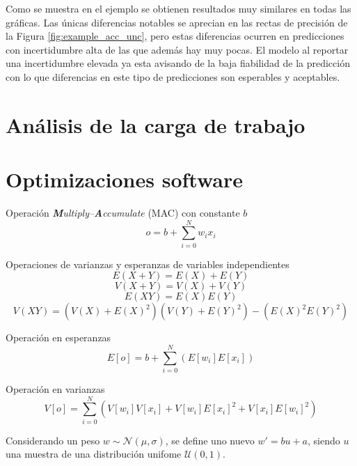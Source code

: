 Como se muestra en el ejemplo se obtienen resultados muy similares en todas las gráficas. Las únicas diferencias notables se aprecian en las rectas de precisión de la Figura \ref{fig:example_acc_unc}, pero estas diferencias ocurren en predicciones con incertidumbre alta de las que además hay muy pocas. El modelo al reportar una incertidumbre elevada ya esta avisando de la baja fiabilidad de la predicción con lo que diferencias en este tipo de predicciones son esperables y aceptables.

\section{Análisis de la carga de trabajo}

\section{Optimizaciones software}
\todo

Operación \textit{\textbf{M}ultiply–\textbf{A}ccumulate} (MAC) con constante $b$
\begin{equation} \label{eq:mac}
o = b + \sum_{i=0}^N w_i x_i
\end{equation}

Operaciones de varianzas y esperanzas de variables independientes \todo
\begin{equation} \label{eq:neuron_variance}
E(X+Y) = E(X)+ E(Y)
\end{equation}
\begin{equation} \label{eq:neuron_variance}
V(X+Y) = V(X) + V(Y)
\end{equation}
\begin{equation} \label{eq:neuron_variance}
E(XY) = E(X)E(Y)
\end{equation}
\begin{equation} \label{eq:neuron_variance}
V(XY) = (V(X)+E(X)^2)(V(Y)+E(Y)^2) - (E(X)^2E(Y)^2)
\end{equation}

Operación en esperanzas
\begin{equation} \label{eq:neuron_expected}
E[o] = b + \sum_{i=0}^N ( E[w_i] E[x_i] )
\end{equation}

Operación en varianzas
\begin{equation} \label{eq:neuron_variance}
V[o] = \sum_{i=0}^N ( V[w_i]V[x_i] + V[w_i]E[x_i]^2 + V[x_i]E[w_i]^2 )
\end{equation}

Considerando un peso $w \sim \mathcal{N}(\mu,\sigma)$, se define uno nuevo $w' = b u + a$, siendo $u$ una muestra de una distribución unifome $\mathcal{U}(0,1)$. 

